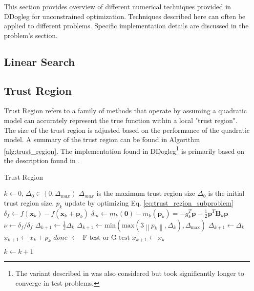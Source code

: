 \documentclass[peerreview,compsoc,onecolumn]{IEEEtran}
\newcommand{\norm}[1]{\left\lVert#1\right\rVert}
\begin{document}
This section provides overview of different numerical techniques provided in DDogleg for unconstrained optimization. Techniques described here can often be applied to different problems. Specific implementation details are discussed in the problem's section.
\subsection{Linear Search}

\subsection{Trust Region}
Trust Region refers to a family of methods that operate by assuming a quadratic model can accurately represent the true function within a local "trust region". The size of the trust region is adjusted based on the performance of the quadratic model. A summary of the trust region can be found in Algorithm \ref{alg:trust_region}. The implementation found in DDogleg\footnote{The variant described in \cite{numopt2006,fletcher1987} was also considered but took significantly longer to converge in test problems.} is primarily based on the description found in \cite{IMM2004}.

\begin{algorithm}{}
\caption{\label{alg:trust_region}Trust Region}
\begin{algorithmic}[1]
	\State $k \gets 0$, $\Delta_0 \in (0,\Delta_{max})$
	\State \quad $\Delta_{max}$ is the maximum trust region size
	\State \quad $\Delta_{0}$ is the initial trust region size. 
	\State $p_k$ update by optimizing Eq. \ref{eq:trust_region_subproblem} 
	\State $\delta_f \gets f(\bm{x}_k) - f(\bm{x}_k + \bm{p}_k)$ 
	\State $\delta_m \gets m_k(\bm{0})-m_k(\bm{p}_k) = -g^T_k \bm{p} - \frac{1}{2}\bm{p}^T \bm{B}_k \bm{p}$ 
	\State $\nu \gets \delta_f / \delta_f$  
	 
		\State $\Delta_{k+1} \gets \frac{1}{2}\Delta_k$
	\Else
			\State $\Delta_{k+1} \gets \mbox{min}(\mbox{max}(3\norm{p_k},\Delta_k),\Delta_{\mbox{max}})$
		\Else
			\State $\Delta_{k+1} \gets \Delta_k$
		\EndIf
	\EndIf
	 
		\State $x_{k+1} \gets x_k + p_k$ 
		\State $done$ $\gets$ $\mbox{F-test}$ or $\mbox{G-test}$ 
	\Else
		\State $x_{k+1} \gets x_k$
	\EndIf

	\State $k \gets k + 1$
	\EndWhile
\end{algorithmic}
\end{algorithm}
\end{document}
